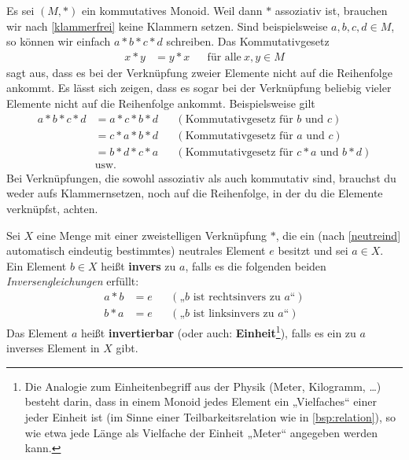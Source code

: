 \begin{bem} \label{reihenfolgeegal}
    Es sei $(M,*)$ ein kommutatives Monoid. Weil dann $*$ assoziativ ist, brauchen wir nach \cref{klammerfrei} keine Klammern setzen. Sind beispielsweise $a,b,c,d\in M$, so können wir einfach $a*b*c*d$ schreiben. Das Kommutativgesetz
    \begin{align*}
        x*y&=y*x && \text{für alle}\ x,y\in M
    \end{align*}
    sagt aus, dass es bei der Verknüpfung zweier Elemente nicht auf die Reihenfolge ankommt. Es lässt sich zeigen, dass es sogar bei der Verknüpfung beliebig vieler Elemente nicht auf die Reihenfolge ankommt. Beispielsweise gilt
    \begin{align*}
        a*b*c*d & = a*c*b*d && (\text{Kommutativgesetz für $b$ und $c$}) \\
        & = c*a*b*d && (\text{Kommutativgesetz für $a$ und $c$}) \\
        & = b*d*c*a && (\text{Kommutativgesetz für $c*a$ und $b*d$}) \\
        & \text{usw.}
    \end{align*}
    Bei Verknüpfungen, die sowohl assoziativ als auch kommutativ sind, brauchst du weder aufs Klammernsetzen, noch auf die Reihenfolge, in der du die Elemente verknüpfst, achten.
\end{bem}


\begin{defin} \label{def:inverse}  
    Sei $X$ eine Menge mit einer zweistelligen Verknüpfung $*$, die ein (nach \cref{neutreind} automatisch eindeutig bestimmtes) neutrales Element $e$ besitzt und sei $a\in X$. Ein Element $b\in X$ heißt \textbf{invers} zu $a$, falls es die folgenden beiden \emph{Inversengleichungen} erfüllt:
    \begin{align*}
        a*b & = e && (\text{„$b$ ist rechtsinvers zu $a$“}) \\
        b*a & = e && (\text{„$b$ ist linksinvers zu $a$“})
    \end{align*}
    Das Element $a$ heißt \textbf{invertierbar} (oder auch: \textbf{Einheit}\footnote{Die Analogie zum Einheitenbegriff aus der Physik (Meter, Kilogramm, \dots) besteht darin, dass in einem Monoid jedes Element ein „Vielfaches“ einer jeder Einheit ist (im Sinne einer Teilbarkeitsrelation wie in \cref{bsp:relation}), so wie etwa jede Länge als Vielfache der Einheit „Meter“ angegeben werden kann.}), falls es ein zu $a$ inverses Element in $X$ gibt.
\end{defin}


